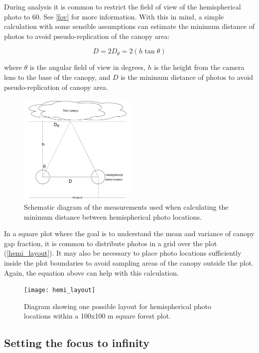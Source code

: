\documentclass[11pt,a4paper]{article}
\begin{document}
During analysis it is common to restrict the field of view of the hemispherical photo to 60\textdegree{}. See \autoref{fov} for more information. With this in mind, a simple calculation with some sensible assumptions can estimate the minimum distance of photos to avoid pseudo-replication of the canopy area:

\begin{equation}
	D = 2D_{\theta} = 2(h \tan{\theta})
\end{equation}

where $\theta$ is the angular field of view in degrees, $h$ is the height from the camera lens to the base of the canopy, and $D$ is the minimum distance of photos to avoid pseudo-replication of canopy area.

\begin{figure}[H]
\centering
	\includegraphics[width=0.5\textwidth]{canopy_trig.drawio}
	\caption{Schematic diagram of the measurements used when calculating the minimum distance between hemispherical photo locations.}
	\label{canopy_trig}
\end{figure}

In a square plot where the goal is to understand the mean and variance of canopy gap fraction, it is common to distribute photos in a grid over the plot (\autoref{hemi_layout}). It may also be necessary to place photo locations sufficiently inside the plot boundaries to avoid sampling areas of the canopy outside the plot. Again, the equation above can help with this calculation.

\begin{figure}[H]
\centering
	\texttt{[image: hemi\_layout]}
	\caption{Diagram showing one possible layout for hemispherical photo locations within a 100x100 m square forest plot.}
	\label{hemi_layout}
\end{figure}

\subsection{Setting the focus to infinity} 
\end{document}
